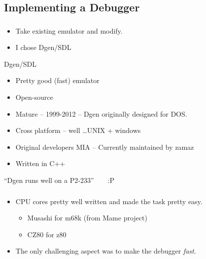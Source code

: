 \documentclass{beamer}
\begin{document}

\subsection{Implementing a Debugger}

\begin{frame}[fragile]
\frametitle{\insertsubsection}

\begin{itemize}
\item Take existing emulator and modify.
\item I chose Dgen/SDL
\end{itemize}

\vfill

\begin{block}{Dgen/SDL}
\begin{itemize}
\item Pretty good (fast) emulator
\item Open-source
\item Mature --  1999-2012 -- Dgen originally designed for DOS.
\item Cross platform -- well \ldots UNIX + windows
\item Original developers MIA -- Currently maintained by zamaz
\item Written in C++
\end{itemize}
\end{block}

\vfill

{\Large ``Dgen runs well on a P2-233''~~~~:P}

\end{frame}

\begin{frame}[fragile]
\frametitle{\insertsubsection}

\begin{itemize}
\item CPU cores pretty well written and made the task pretty easy.
\begin{itemize}
\item Musashi for m68k (from Mame project)
\item CZ80 for z80
\end{itemize}
\vfill
\item The only challenging aspect was to make the debugger \emph{fast}.
\end{itemize}

\vfill

\end{frame}
\end{document}

